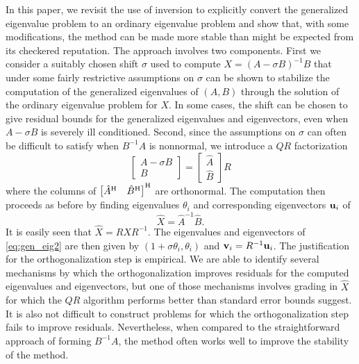 \documentclass[12pt]{article}
\def\vec#1{{\bf #1}}
\def\H{{\rm H}}
\begin{document}
In this paper, we revisit the use of inversion to explicitly convert
the generalized eigenvalue problem to an ordinary eigenvalue problem
and show that, with some modifications, the method can be made more
stable than might be expected from its checkered reputation.  The
approach involves two components.  First we consider a suitably chosen
shift $\sigma$ used to compute $X=(A-\sigma B)^{-1} B$ that under some
fairly restrictive assumptions on $\sigma$ can be shown to stabilize
the computation of the generalized eigenvalues of $(A,B)$ through the
solution of the ordinary eigenvalue problem for $X$.  In some cases,
the shift can be chosen to give residual bounds for the generalized
eigenvalues and eigenvectors, even when $A-\sigma B$ is severely ill
conditioned.  Second, since the assumptions on $\sigma$ can often be
difficult to satisfy when $B^{-1}A$ is nonnormal, we introduce a $QR$
factorization
\begin{equation*}
  \begin{bmatrix}
    A-\sigma B \\ B
  \end{bmatrix} =
  \begin{bmatrix}
    \hat{A} \\ \hat{B}
  \end{bmatrix} R
\end{equation*}
where the columns of
$\begin{bmatrix} \hat{A}^\H & \hat{B}^\H \end{bmatrix}^\H$ are
orthonormal.  The computation then proceeds as before by finding
eigenvalues $\theta_i$ and corresponding eigenvectors $\vec{u}_i$ of
\begin{equation*}
  \hat{X} = \hat{A}^{-1} \hat{B}.
\end{equation*}
It is easily seen that $\hat{X} = R X R^{-1}$.  The eigenvalues and
eigenvectors of \eqref{eq:gen_eig2} are then given by
$(1+\sigma \theta_i, \theta_i)$ and $\vec{v}_i = R^{-1} \vec{u}_i$.
The justification for the orthogonalization step is empirical.  We are
able to identify several mechanisms by which the orthogonalization
improves residuals for the computed eigenvalues and eigenvectors, but
one of those mechanisms involves grading in $\hat{X}$ for which the
$QR$ algorithm performs better than standard error bounds suggest.  It
is also not difficult to construct problems for which the
orthogonalization step fails to improve residuals.  Nevertheless, when
compared to the straightforward approach of forming $B^{-1}A$, the
method often works well to improve the stability of the method.
\end{document}
